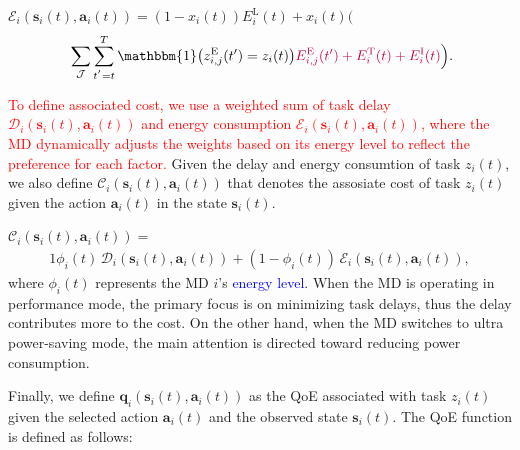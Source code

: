 \documentclass[10pt, journal,letterpaper]{IEEEtran}
\begin{document}
$\mathcal{E}_i(\boldsymbol{s}_i(t),\boldsymbol{a}_i(t)) = (1-x_i(t)) E_i^{\text{L}}(t)+x_i(t) \Big( $
\begin{alignat}{1}
	\hspace{0.1cm} \sum\limits_{\mathcal{J}} \sum\limits_{t^{'}=t}^{T}\mathbbm{1}\big(z_{i,j}^{\text{E}}(t') = z_i(t)\big)
	 \textcolor{purple}{ E_{i,j}^{\text{E}}(t') + E_i^{\text{T}}(t) +  E_i^{\text{I}}(t)}\Big).
	\label{22}  
\end{alignat}

\textcolor{red}{To define associated cost, we use a weighted sum of task delay $\mathcal{D}_i(\boldsymbol{s}_i(t),\boldsymbol{a}_i(t))$ and energy consumption $\mathcal{E}_i(\boldsymbol{s}_i(t),\boldsymbol{a}_i(t))$, where the MD dynamically adjusts the weights based on its energy level to reflect the preference for each factor.}
Given the delay and energy consumtion of task $z_i(t)$, we also define $\mathcal{C}_i(\boldsymbol{s}_i(t),\boldsymbol{a}_i(t))$ that denotes the assosiate cost of task $z_i(t)$ given the action $\boldsymbol{a}_i(t)$ in the state $\boldsymbol{s}_i(t)$. \vspace{1.7mm}


$\mathcal{C}_i(\boldsymbol{s}_i(t),\boldsymbol{a}_i(t)) =$
\begin{alignat}{1}
	\phi_i(t) \, \mathcal{D}_i(\boldsymbol{s}_i(t),\boldsymbol{a}_i(t)) +(1-\phi_i(t)) \, \mathcal{E}_i(\boldsymbol{s}_i(t),\boldsymbol{a}_i(t)),
	\label{23}  
\end{alignat}
where $\phi_i(t)$ represents the MD $i$'s \textcolor{blue}{energy level}. When the MD is operating in performance mode, the primary focus is on minimizing task delays, thus the delay contributes more to the cost. On the other hand, when the MD switches to ultra power-saving mode, the main attention is directed toward reducing power consumption.

Finally, we define $\boldsymbol{q}_i(\boldsymbol{s}_i(t),\boldsymbol{a}_i(t))$ as the QoE associated with task $z_i(t)$ given the selected action $\boldsymbol{a}_i(t)$ and the observed state $\boldsymbol{s}_i(t)$. The QoE function is defined as follows:\vspace{1.7mm}
\end{document}
